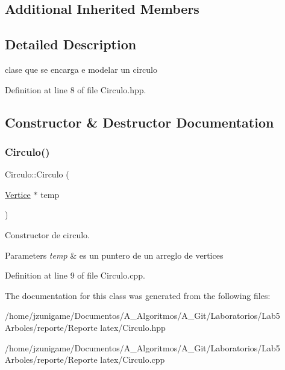 \subsection*{Additional Inherited Members}


\subsection{Detailed Description}
clase que se encarga e modelar un circulo 

Definition at line 8 of file Circulo.\+hpp.



\subsection{Constructor \& Destructor Documentation}
\mbox{\label{class_circulo_a790ee75260b927c3b54d534a5d2bab1c}} 
\subsubsection{\texorpdfstring{Circulo()}{Circulo()}}
{\footnotesize\ttfamily Circulo\+::\+Circulo (\begin{DoxyParamCaption}\item[{\hyperlink{class_vertice}{Vertice} $\ast$}]{temp }\end{DoxyParamCaption})}



Constructor de circulo. 


\begin{DoxyParams}{Parameters}
{\em temp} & es un puntero de un arreglo de vertices \\
\hline
\end{DoxyParams}


Definition at line 9 of file Circulo.\+cpp.



The documentation for this class was generated from the following files\+:\begin{DoxyCompactItemize}
\item 
/home/jzunigame/\+Documentos/\+A\+\_\+\+Algoritmos/\+A\+\_\+\+Git/\+Laboratorios/\+Lab5 Arboles/reporte/\+Reporte latex/Circulo.\+hpp\item 
/home/jzunigame/\+Documentos/\+A\+\_\+\+Algoritmos/\+A\+\_\+\+Git/\+Laboratorios/\+Lab5 Arboles/reporte/\+Reporte latex/Circulo.\+cpp\end{DoxyCompactItemize}
